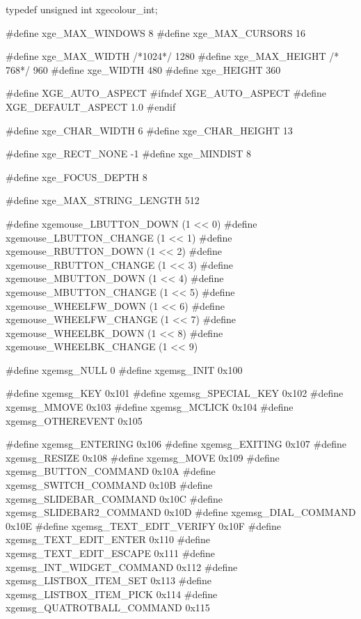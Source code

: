 \begin{listingC}
typedef unsigned int xgecolour_int;

#define xge_MAX_WINDOWS         8
#define xge_MAX_CURSORS        16

#define xge_MAX_WIDTH   /*1024*/ 1280
#define xge_MAX_HEIGHT  /* 768*/  960
#define xge_WIDTH             480
#define xge_HEIGHT            360

#define XGE_AUTO_ASPECT
#ifndef XGE_AUTO_ASPECT
#define XGE_DEFAULT_ASPECT    1.0
#endif

#define xge_CHAR_WIDTH          6
#define xge_CHAR_HEIGHT        13

#define xge_RECT_NONE          -1
#define xge_MINDIST             8

#define xge_FOCUS_DEPTH         8

#define xge_MAX_STRING_LENGTH 512


#define xgemouse_LBUTTON_DOWN    (1 << 0)
#define xgemouse_LBUTTON_CHANGE  (1 << 1)
#define xgemouse_RBUTTON_DOWN    (1 << 2)
#define xgemouse_RBUTTON_CHANGE  (1 << 3)
#define xgemouse_MBUTTON_DOWN    (1 << 4)
#define xgemouse_MBUTTON_CHANGE  (1 << 5)
#define xgemouse_WHEELFW_DOWN    (1 << 6)
#define xgemouse_WHEELFW_CHANGE  (1 << 7)
#define xgemouse_WHEELBK_DOWN    (1 << 8)
#define xgemouse_WHEELBK_CHANGE  (1 << 9)

#define xgemsg_NULL                              0
#define xgemsg_INIT                          0x100

#define xgemsg_KEY                           0x101
#define xgemsg_SPECIAL_KEY                   0x102
#define xgemsg_MMOVE                         0x103
#define xgemsg_MCLICK                        0x104
#define xgemsg_OTHEREVENT                    0x105

#define xgemsg_ENTERING                      0x106
#define xgemsg_EXITING                       0x107
#define xgemsg_RESIZE                        0x108
#define xgemsg_MOVE                          0x109
#define xgemsg_BUTTON_COMMAND                0x10A
#define xgemsg_SWITCH_COMMAND                0x10B
#define xgemsg_SLIDEBAR_COMMAND              0x10C
#define xgemsg_SLIDEBAR2_COMMAND             0x10D
#define xgemsg_DIAL_COMMAND                  0x10E
#define xgemsg_TEXT_EDIT_VERIFY              0x10F
#define xgemsg_TEXT_EDIT_ENTER               0x110
#define xgemsg_TEXT_EDIT_ESCAPE              0x111
#define xgemsg_INT_WIDGET_COMMAND            0x112
#define xgemsg_LISTBOX_ITEM_SET              0x113
#define xgemsg_LISTBOX_ITEM_PICK             0x114
#define xgemsg_QUATROTBALL_COMMAND           0x115


\end{listingC}
